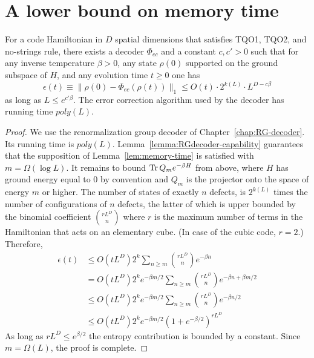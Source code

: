 \section{A lower bound on memory time}
\label{sec:memory-time}
  
\begin{theorem}
\label{thm:memorytime}
For a code Hamiltonian in $D$ spatial dimensions
that satisfies TQO1, TQO2, and no-strings rule,
there exists a decoder $\Phi_{ec}$ and a constant $c,c'>0$
such that for any inverse temperature $\beta>0$,
any state $\rho(0)$ supported on the ground subspace of $H$,
and any evolution time $t \ge 0$ one has
\begin{equation}
\label{error-bound}
\epsilon(t)\equiv \| \rho(0) - \Phi_{ec}(\rho(t)) \|_1 \le O(t) \cdot 2^{k(L)} \cdot L^{D-c\beta}
\end{equation}
as long as $L\le e^{c' \beta}$.
The error correction algorithm used by the decoder
has running time $poly(L)$.
\end{theorem}
\begin{proof}
We use the renormalization group decoder of Chapter~\ref{chap:RG-decoder}.
Its running time is $poly(L)$.
Lemma~\ref{lemma:RGdecoder-capability} guarantees
that the supposition of Lemma~\ref{lem:memory-time} is satisfied
with $m = \Omega(\log L)$.
It remains to bound $\mathop{\mathrm{Tr}}\nolimits Q_m e^{-\beta H}$ from above, 
where $H$ has ground energy equal to $0$ by convention
and $Q_m$ is the projector onto the space of energy $m$ or higher.
The number of states of exactly $n$ defects,
is $2^{k(L)}$ times the number of configurations of $n$ defects,
the latter of which is upper bounded by the binomial coefficient $\binom{rL^D}{n}$
where $r$ is the maximum number of terms in the Hamiltonian that acts on an elementary cube.
(In case of the cubic code, $r=2$.)
Therefore,
\begin{align}
\epsilon(t)
&\le O(t L^D) 2^k \sum_{n \ge m} \binom{rL^D}{n} e^{-\beta n} \nonumber \\
&= O(t L^D) 2^k e^{-\beta m/2} \sum_{n \ge m} \binom{rL^D}{n} e^{-\beta n + \beta m /2 } \nonumber \\
&\le O(t L^D) 2^k e^{-\beta m/2} \sum_{n \ge m} \binom{rL^D}{n} e^{- \beta n / 2 } \nonumber \\
&\le O(t L^D) 2^k e^{-\beta m/2} \left( 1 + e^{-\beta/2} \right)^{rL^D}
\label{eq:tradeoff}
\end{align}
As long as $rL^D \le e^{\beta/2}$ the entropy contribution is bounded by a constant.
Since $m = \Omega(L)$, the proof is complete.
\end{proof}

